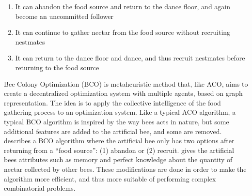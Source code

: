 \begin{enumerate}
  \item It can abandon the food source and return to the dance floor, and again become an uncommitted follower
  \item It can continue to gather nectar from the food source without recruiting nestmates
  \item It can return to the dance floor and dance, and thus recruit nestmates before returning to the food source
\end{enumerate}

Bee Colony Optimization (BCO) is metaheuristic method that, like ACO, aims to create a decentralized optimization system with multiple agents, based on graph representation. The idea is to apply the collective intelligence of the food gathering process to an optimization system. Like a typical ACO algorithm, a typical BCO algorithm is inspired by the way bees acts in nature, but some additional features are added to the artificial bee, and some are removed. \citet{nikolic14} describes a BCO algorithm where the artificial bee only has two options after returning from a ``food source'': (1) abandon or (2) recruit. \citet{lucic03} gives the artificial bees attributes such as memory and perfect knowledge about the quantity of nectar collected by other bees. These modifications are done in order to make the algorithm more efficient, and thus more suitable of performing complex combinatorial problems.

